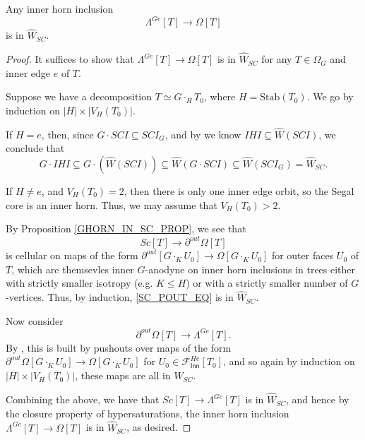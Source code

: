 \documentclass[a4paper,10pt,draft]{article}%
\begin{document}
\begin{proposition}
      \label{GHORN_IN_SC_PROP}
      Any inner horn inclusion
      \begin{equation}
            \Lambda^{G e}[T] \to \Omega[T]
      \end{equation}
      is in $\hat{W}_{SC}.$
\end{proposition}
\begin{proof}
      It suffices to show that $\Lambda^{G e}[T] \to \Omega[T]$ is in $\hat{W}_{SC}$
      for any $T\in \Omega_G$ and inner edge $e$ of $T$.

      Suppose we have a decomposition $T \simeq G \cdot_H T_0$, where $H = \mathrm{Stab}(T_0)$.
      We go by induction on $|H| \times |V_H(T_0)|$.

      If $H = e$, then, since $G \cdot SCI \subseteq SCI_G$,
      and by \cite[2.5]{CM13a} we know $IHI \subseteq \hat{W}(SCI)$, we conclude that
      \begin{equation}
            G \cdot IHI \subseteq G \cdot (\hat{W}(SCI)) \subseteq \hat{W}(G \cdot SCI) \subseteq \hat{W}(SCI_G) = \hat{W}_{SC}.
      \end{equation}
      
      If $H \neq e$, and $V_H(T_0) = 2$, then there is only one inner edge orbit, so
      the Segal core is an inner horn.
      Thus, we may assume that $V_H(T_0) > 2$.

      By Proposition \ref{GHORN_IN_SC_PROP}, we see that
      \begin{equation}
            \label{SC_POUT_EQ}
            Sc[T] \to \partial^{out}\Omega[T]
      \end{equation}
      is cellular on maps of the form
      $\partial^{out}[G \cdot_K U_0] \to \Omega[G \cdot_K U_0]$ for outer faces $U_0$ of $T$,
      which are themsevles inner $G$-anodyne on inner horn inclusions in trees either
      with strictly smaller isotropy (e.g. $K \leq H$) or
      with a strictly smaller number of $G$-vertices.
      Thus, by induction, \eqref{SC_POUT_EQ} is in $\hat{W}_{SC}$. 

      Now consider
      \begin{equation}
            \label{POUT_GHORN_EQ}
            \partial^{out}\Omega[T] \to \Lambda^{G e}[T].
      \end{equation}
      By \cite[Proposition 6.17]{Per17},
      this is built by pushouts over maps of the form
      $\partial^{out}\Omega[G \cdot_K U_0] \to \Omega[G \cdot_K U_0]$ for $U_0 \in \mathscr{F}_{\mathsf{Inn}}^{H e}[T_0]$,
      and so again by induction on $|H| \times |V_H(T_0)|$, these maps are all in $\hat{W}_{SC}$. 
      
      Combining the above, we have that $Sc[T] \to \Lambda^{G e}[T]$ is in $\hat{W}_{SC}$, and hence
      by the closure property of hypersaturations, the inner horn inclusion $\Lambda^{G e}[T] \to \Omega[T]$
      is in $\hat{W}_{SC}$, as desired.
\end{proof}
\end{document}
